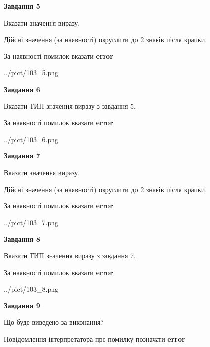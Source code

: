 \documentclass[11pt, ukrainian]{article}
\begin{document}
{\begin {large}
{\begin {center}\textbf{Завдання 5}\end {center}}\par
Вказати значення виразу. \par
Дійсні значення (за наявності) округлити до 2 знаків після крапки. \par
За наявності помилок вказати \textbf{error}

\begin{center}
	{../pict/103_5.png}
\end{center}
\newpage

{\begin {center}\textbf{Завдання 6}\end {center}}\par
Вказати ТИП значення виразу з завдання 5. \par
За наявності помилок вказати \textbf{error}

\begin{center}
	{../pict/103_6.png}
\end{center}
\newpage

{\begin {center}\textbf{Завдання 7}\end {center}}\par
Вказати значення виразу. \par
Дійсні значення (за наявності) округлити до 2 знаків після крапки. \par
За наявності помилок вказати \textbf{error}

\begin{center}
	{../pict/103_7.png}
\end{center}
\newpage

{\begin {center}\textbf{Завдання 8}\end {center}}\par
Вказати ТИП значення виразу з завдання 7. \par
За наявності помилок вказати \textbf{error}

\begin{center}
	{../pict/103_8.png}
\end{center}
\newpage

{\begin {center}\textbf{Завдання 9}\end {center}}\par
Що буде виведено за виконання? \par
Повідомлення інтерпретатора про помилку позначати \textbf{error}


\end{large}}
\end{document}
